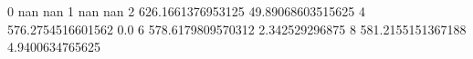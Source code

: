 0 nan nan
1 nan nan
2 626.1661376953125 49.89068603515625
4 576.2754516601562 0.0
6 578.6179809570312 2.342529296875
8 581.2155151367188 4.9400634765625

